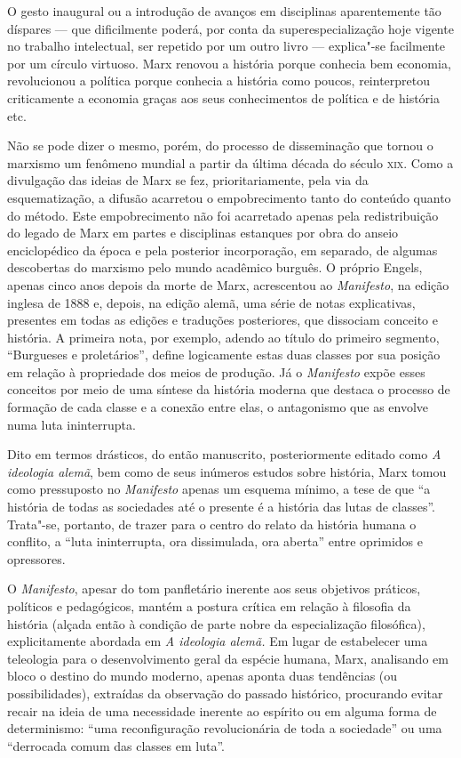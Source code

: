 O gesto inaugural ou a introdução de avanços em disciplinas
aparentemente tão díspares --- que dificilmente poderá, por conta da
superespecialização hoje vigente no trabalho intelectual, ser repetido
por um outro livro --- explica"-se facilmente por um círculo virtuoso.
Marx renovou a história porque conhecia bem economia, revolucionou a
política porque conhecia a história como poucos, reinterpretou
criticamente a economia graças aos seus conhecimentos de política e de
história etc.

Não se pode dizer o mesmo, porém, do processo de disseminação que tornou
o marxismo um fenômeno mundial a partir da última década do século \textsc{xix}.
Como a divulgação das ideias de Marx se fez, prioritariamente, pela via da
esquematização, a difusão acarretou o empobrecimento tanto do conteúdo
quanto do método. Este empobrecimento não foi acarretado apenas pela
redistribuição do legado de Marx em partes e disciplinas estanques por
obra do anseio enciclopédico da época e pela posterior incorporação, em
separado, de algumas descobertas do marxismo pelo mundo acadêmico
burguês. O próprio Engels, apenas cinco anos depois da morte de Marx,
acrescentou ao \textit{Manifesto}, na edição inglesa de 1888 e, depois,
na edição alemã, uma série de notas explicativas, presentes em todas as
edições e traduções posteriores, que dissociam conceito e história. A
primeira nota, por exemplo, adendo ao título do primeiro segmento,
“Burgueses e proletários”, define logicamente estas duas classes por
sua posição em relação à propriedade dos meios de produção. Já o
\textit{Manifesto} expõe esses conceitos por meio de uma síntese da
história moderna que destaca o processo de formação de cada classe e a
conexão entre elas, o antagonismo que as envolve numa luta
ininterrupta.

Dito em termos drásticos, do então manuscrito, posteriormente editado
como \textit{A ideologia alemã}, bem como de seus inúmeros estudos
sobre história, Marx tomou como pressuposto no \textit{Manifesto}
apenas um esquema mínimo, a tese de que “a história de todas as
sociedades até o presente é a história das lutas de classes”.
Trata"-se, portanto, de trazer para o centro do relato da história
humana o conflito, a “luta ininterrupta, ora dissimulada, ora aberta”
entre oprimidos e opressores.

O \textit{Manifesto}, apesar do tom panfletário inerente aos seus
objetivos práticos, políticos e pedagógicos, mantém a postura crítica
em relação à filosofia da história (alçada então à condição de parte
nobre da especialização filosófica), explicitamente abordada em
\textit{A ideologia alemã.} Em lugar de estabelecer uma teleologia para
o desenvolvimento geral da espécie humana, Marx, analisando em bloco o
destino do mundo moderno, apenas aponta duas tendências (ou
possibilidades), extraídas da observação do passado histórico,
procurando evitar recair na ideia de uma necessidade inerente ao
espírito ou em alguma forma de determinismo: “uma reconfiguração
revolucionária de toda a sociedade” ou uma “derrocada comum das classes
em luta”.

